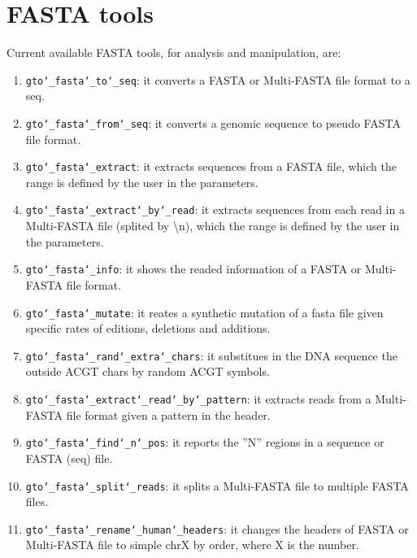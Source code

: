 \chapter{FASTA tools}
\label{fasta}

Current available FASTA tools, for analysis and manipulation, are:
\begin{enumerate}
\item \texttt{gto\char`_fasta\char`_to\char`_seq}: it converts a FASTA or Multi-FASTA file format to a seq.
\item \texttt{gto\char`_fasta\char`_from\char`_seq}: it converts a genomic sequence to pseudo FASTA file format.
\item \texttt{gto\char`_fasta\char`_extract}: it extracts sequences from a FASTA file, which the range is defined by the user in the parameters.
\item \texttt{gto\char`_fasta\char`_extract\char`_by\char`_read}: it extracts sequences from each read in a Multi-FASTA file (splited by \textbackslash n), which the range is defined by the user in the parameters.
\item \texttt{gto\char`_fasta\char`_info}: it shows the readed information of a FASTA or Multi-FASTA file format.
\item \texttt{gto\char`_fasta\char`_mutate}: it reates a synthetic mutation of a fasta file given specific rates of editions, deletions and additions.
\item \texttt{gto\char`_fasta\char`_rand\char`_extra\char`_chars}: it substitues in the DNA sequence the outside ACGT chars by random ACGT symbols.
\item \texttt{gto\char`_fasta\char`_extract\char`_read\char`_by\char`_pattern}: it extracts reads from a Multi-FASTA file format given a pattern in the header.
\item \texttt{gto\char`_fasta\char`_find\char`_n\char`_pos}: it reports the ''N'' regions in a sequence or FASTA (seq) file.
\item \texttt{gto\char`_fasta\char`_split\char`_reads}: it splits a Multi-FASTA file to multiple FASTA files.
\item \texttt{gto\char`_fasta\char`_rename\char`_human\char`_headers}: it changes the headers of FASTA or Multi-FASTA file to simple chrX by order, where X is the number.

\end{enumerate}





 





